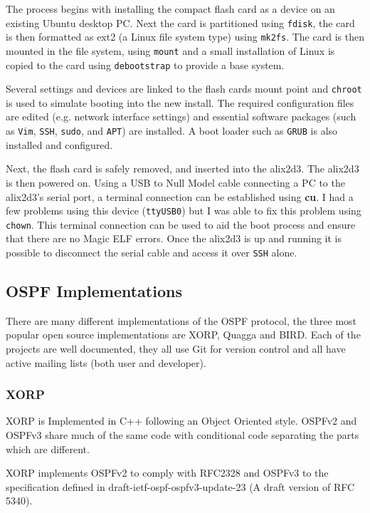 \documentclass[12pt]{report}
\begin{document}
The process begins with installing the compact flash card as a device on an
existing Ubuntu desktop PC. Next the card is partitioned using \texttt{fdisk},
the card is then formatted as ext2 (a Linux file system type) using
\texttt{mk2fs}. The card is then mounted in the file system, using
\texttt{mount} and a small installation of Linux is copied to the card using
\texttt{debootstrap} to provide a base system.  

Several settings and devices are linked to the flash cards mount point and
\texttt{chroot} is used to simulate booting into the new install. The required
configuration files are edited (e.g. network interface settings) and essential
software packages (such as \texttt{Vim}, \texttt{SSH}, \texttt{sudo}, and
\texttt{APT}) are installed. A boot loader such as \texttt{GRUB} is also
installed and configured. 

Next, the flash card is safely removed, and  inserted into the alix2d3. The
alix2d3 is then powered on. Using a USB to Null Model cable connecting a PC to
the alix2d3's serial port, a terminal connection can be established using {\bf
cu}. I had a few problems using this device (\texttt{ttyUSB0}) but I was able to
fix this problem using \texttt{chown}. This terminal connection can be used to
aid the boot process and ensure that there are no Magic ELF errors. Once the
alix2d3 is up and running it is possible to disconnect the serial cable and
access it over \texttt{SSH} alone. 

\subsection{OSPF Implementations}
There are many different implementations of the OSPF protocol, the three most
popular open source implementations are XORP, Quagga and BIRD. Each of the
projects are well documented, they all use Git for version control and all have
active mailing lists (both user and developer).

\subsubsection{XORP}
XORP\cite{XORPHome} is Implemented in C++ following an Object Oriented style.
OSPFv2 and OSPFv3 share much of the same code with conditional code separating
the parts which are different.

XORP implements OSPFv2 to comply with RFC2328 and OSPFv3 to the specification
defined in draft-ietf-ospf-ospfv3-update-23 (A draft version of RFC 5340).
\end{document}
